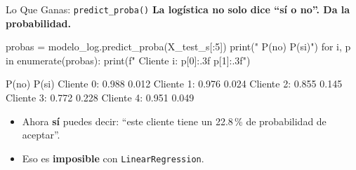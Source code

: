 \documentclass[aspectratio=169, 11pt]{beamer}
\begin{document}
\begin{frame}[fragile,shrink=35]{Lo Que Ganas: \texttt{predict\_proba()}}
  \vspace{-6pt}
  {\footnotesize\color{arcaDark}\bfseries
    La logística no solo dice ``sí o no''. Da la \textbf{probabilidad}.}

  \vspace{4pt}
  \begin{pyblock}
probas = modelo_log.predict_proba(X_test_s[:5])
print("     P(no)   P(si)")
for i, p in enumerate(probas):
    print(f"  Cliente {i}: {p[0]:.3f}    {p[1]:.3f}")
  \end{pyblock}

  \vspace{4pt}
  \begin{outputblock}
     P(no)   P(si)
  Cliente 0: 0.988    0.012
  Cliente 1: 0.976    0.024
  Cliente 2: 0.855    0.145
  Cliente 3: 0.772    0.228
  Cliente 4: 0.951    0.049
  \end{outputblock}

  \vspace{4pt}
  {\scriptsize\color{textMuted}
  \begin{itemize}\setlength{\itemsep}{3pt}
    \item[{\color{arcaRed}\scriptsize\faArrowRight}]
      Ahora \textbf{sí} puedes decir: ``este cliente tiene un 22.8\,\% de
      probabilidad de aceptar''.
    \item[{\color{arcaRed}\scriptsize\faArrowRight}]
      Eso es \textbf{imposible} con \texttt{LinearRegression}.
  \end{itemize}
  }
\end{frame}
\end{document}
